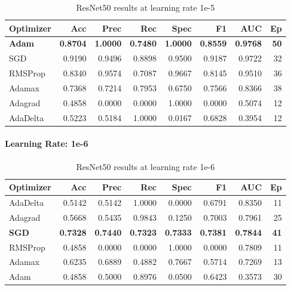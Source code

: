 \begingroup
\tiny
\setlength{\tabcolsep}{2.5pt}
\begin{table}[H]
  \centering
  \caption{ResNet50 results at learning rate 1e-5}
  \label{tab:resnet50-1e5}
  \begin{tabular}{l r r r r r r r}
    \toprule
    \rowcolor{tableheader}
    \textbf{Optimizer} & \textbf{Acc} & \textbf{Prec} & \textbf{Rec} &
    \textbf{Spec} & \textbf{F1} & \textbf{AUC} & \textbf{Ep} \\
    \midrule
    \textbf{Adam}     & \textbf{0.8704} & \textbf{1.0000} & \textbf{0.7480} & \textbf{1.0000} & \textbf{0.8559} & \textbf{0.9768} & \textbf{50} \\
    SGD      & 0.9190 & 0.9496 & 0.8898 & 0.9500 & 0.9187 & 0.9722 & 32 \\
    RMSProp  & 0.8340 & 0.9574 & 0.7087 & 0.9667 & 0.8145 & 0.9510 & 36 \\
    Adamax   & 0.7368 & 0.7214 & 0.7953 & 0.6750 & 0.7566 & 0.8366 & 38 \\
    Adagrad  & 0.4858 & 0.0000 & 0.0000 & 1.0000 & 0.0000 & 0.5074 & 12 \\
    AdaDelta & 0.5223 & 0.5184 & 1.0000 & 0.0167 & 0.6828 & 0.3954 & 12 \\
    \bottomrule
  \end{tabular}
\end{table}
\endgroup

\paragraph{Learning Rate: 1e-6}

\begingroup
\tiny
\setlength{\tabcolsep}{2.5pt}
\begin{table}[H]
  \centering
  \caption{ResNet50 results at learning rate 1e-6}
  \label{tab:resnet50-1e6}
  \begin{tabular}{l r r r r r r r}
    \toprule
    \rowcolor{tableheader}
    \textbf{Optimizer} & \textbf{Acc} & \textbf{Prec} & \textbf{Rec} &
    \textbf{Spec} & \textbf{F1} & \textbf{AUC} & \textbf{Ep} \\
    \midrule
    AdaDelta & 0.5142 & 0.5142 & 1.0000 & 0.0000 & 0.6791 & 0.8350 & 11 \\
    Adagrad  & 0.5668 & 0.5435 & 0.9843 & 0.1250 & 0.7003 & 0.7961 & 25 \\
    \textbf{SGD}      & \textbf{0.7328} & \textbf{0.7440} & \textbf{0.7323} & \textbf{0.7333} & \textbf{0.7381} & \textbf{0.7844} & \textbf{41} \\
    RMSProp  & 0.4858 & 0.0000 & 0.0000 & 1.0000 & 0.0000 & 0.7809 & 11 \\
    Adamax   & 0.6235 & 0.6889 & 0.4882 & 0.7667 & 0.5714 & 0.7269 & 13 \\
    Adam     & 0.4858 & 0.5000 & 0.8976 & 0.0500 & 0.6423 & 0.3573 & 30 \\
    \bottomrule
  \end{tabular}
\end{table}
\endgroup

